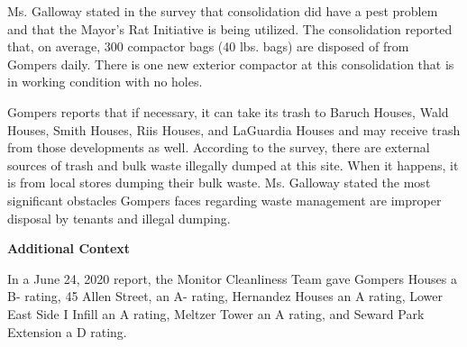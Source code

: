  

Ms. Galloway stated in the survey that consolidation did have a pest problem and that the Mayor's Rat Initiative is being utilized. The consolidation reported that, on average, 300 compactor bags (40 lbs. bags)  are disposed of from Gompers daily. There is one new exterior compactor at this consolidation that is in working condition with no holes. 

Gompers reports that if necessary, it can take its trash to Baruch Houses, Wald Houses, Smith Houses, Riis Houses, and LaGuardia Houses and may receive trash from those developments as well. According to the survey, there are external sources of trash and bulk waste illegally dumped at this site.  When it happens, it is from local stores dumping their bulk waste. Ms. Galloway stated the most significant obstacles Gompers faces regarding waste management are improper disposal by tenants and illegal dumping. 

\textbf{Additional Context}  

In a June 24, 2020 report, the Monitor Cleanliness Team gave Gompers Houses a B- rating, 45 Allen Street, an A- rating, Hernandez Houses an A rating, Lower East Side I Infill an A rating, Meltzer Tower an A rating, and Seward Park Extension a D rating.  